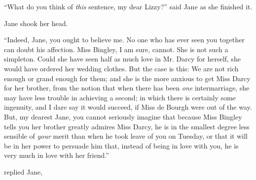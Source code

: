 “What do you think of {\em this} sentence, my dear Lizzy?” said Jane as she finished it. 




Jane shook her head.

“Indeed, Jane, you ought to believe me. No one who has ever seen you together can doubt his affection. Miss Bingley, I am sure, cannot. She is not such a simpleton. Could she have seen half as much love in Mr. Darcy for herself, she would have ordered her wedding clothes. But the case is this: We are not rich enough or grand enough for them; and she is the more anxious to get Miss Darcy for her brother, from the notion that when there has been {\em one} intermarriage, she may have less trouble in achieving a second; in which there is certainly some ingenuity, and I dare say it would succeed, if Miss de Bourgh were out of the way. But, my dearest Jane, you cannot seriously imagine that because Miss Bingley tells you her brother greatly admires Miss Darcy, he is in the smallest degree less sensible of {\em your} merit than when he took leave of you on Tuesday, or that it will be in her power to persuade him that, instead of being in love with you, he is very much in love with her friend.”

 replied Jane, 


